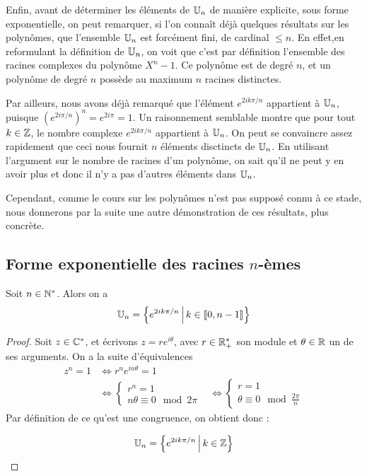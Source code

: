 Enfin, avant de déterminer les éléments de $\mathbb{U}_n$ de manière explicite, sous forme exponentielle, on peut remarquer, si l'on connaît déjà quelques résultats sur les polynômes, que l'ensemble $\mathbb{U}_n$ est forcément fini, de cardinal $\leq n$. En effet,en reformulant la définition de $\mathbb{U}_n$, on voit que c'est par définition l'ensemble des racines complexes du polynôme $X^n-1$. Ce polynôme est de degré $n$, et un polynôme de degré $n$ possède au maximum $n$ racines distinctes.

Par ailleurs, nous avons déjà remarqué que l'élément $e^{2ik\pi/n}$ appartient à $\mathbb{U}_n$, puisque $\left(e^{2i\pi/n}\right)^n=e^{2i\pi}=1$. Un raisonnement semblable montre que pour tout $k\in\mathbb{Z}$, le nombre complexe $e^{2ik\pi/n}$ appartient à $\mathbb{U}_n$. On peut se convaincre assez rapidement que ceci nous fournit $n$ éléments disctincts de $\mathbb{U}_n$. En utilisant l'argument sur le nombre de racines d'un polynôme, on sait qu'il ne peut y en avoir plus et donc il n'y a pas d'autres éléments dans $\mathbb{U}_n$.

Cependant, comme le cours sur les polynômes n'est pas supposé connu à ce stade, nous donnerons par la suite une autre démonstration de ces résultats, plus concrète.

\subsection{Forme exponentielle des racines $n$-èmes}


\begin{proposition}
\label{prop:gen_U_n}
Soit $n\in\mathbb{N}^*$. Alors on a
\[ \U_n = \ensemble{e^{2ik\pi/n}}{k\in \llbracket 0,n-1\rrbracket}\]
\end{proposition}
\begin{proof}
Soit $z\in\mathbb{C}^*$, et écrivons $z=re^{i\theta}$, avec $r\in\mathbb{R}_+^*$ son module et $\theta\in\mathbb{R}$ un de ses arguments. On a la suite d'équivalences
\begin{align*}
z^n=1 &\iff r^ne^{in\theta}=1\\
&\iff \begin{cases}r^n=1\\n\theta \equiv 0\mod 2\pi\end{cases}
&\iff \begin{cases}r=1\\\theta \equiv 0\mod \frac{2\pi}{n}\end{cases}
\end{align*}
Par définition de ce qu'est une congruence, on obtient donc :

\[ \U_n = \ensemble{e^{2ik\pi/n}}{k\in \Z}\]
\end{proof}

